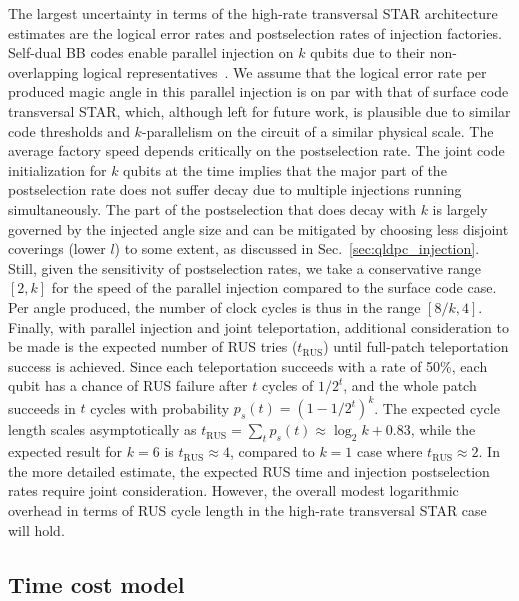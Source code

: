 \documentclass[aps, prx, reprint, superscriptaddress, longbibliography, floatfix]{revtex4-2}
\begin{document}
The largest uncertainty in terms of the high-rate transversal STAR architecture estimates are the logical error rates and postselection rates of injection factories. Self-dual BB codes enable parallel injection on $k$ qubits due to their non-overlapping logical representatives~\cite{Xu2025batched}. We assume that the logical error rate per produced magic angle in this parallel injection is on par with that of surface code transversal STAR, which, although left for future work, is plausible due to similar code thresholds and $k$-parallelism on the circuit of a similar physical scale. The average factory speed depends critically on the postselection rate. The joint code initialization for $k$ qubits at the time implies that the major part of the postselection rate does not suffer decay due to multiple injections running simultaneously. The part of the postselection that does decay with $k$ is largely governed by the injected angle size and can be mitigated by choosing less disjoint coverings (lower $l$) to some extent, as discussed in Sec.~\ref{sec:qldpc_injection}. Still, given the sensitivity of postselection rates, we take a conservative range $[2,k]$ for the speed of the parallel injection compared to the surface code case. Per angle produced, the number of clock cycles is thus in the range $[8/k, 4]$. Finally, with parallel injection and joint teleportation, additional consideration to be made is the expected number of RUS tries ($t_{\mathrm{RUS}}$) until full-patch teleportation success is achieved. Since each teleportation succeeds with a rate of 50\%,  each qubit has a chance of RUS failure after $t$ cycles of $1/2^t$, and the whole patch succeeds in $t$ cycles with probability $p_s(t)=(1-1/2^t)^k$. The expected cycle length scales asymptotically as $t_{\mathrm{RUS}} =\sum_tp_s(t) \approx \log_2k+ 0.83$, while the expected result for $k=6$ is  $t_{\mathrm{RUS}}\approx 4$, compared to $k=1$ case where $t_{\mathrm{RUS}}\approx 2$. In the more detailed estimate, the expected RUS time and injection postselection rates require joint consideration. However, the overall modest logarithmic overhead in terms of RUS cycle length in the high-rate transversal STAR case will hold.




\subsection{Time cost model}
\label{sec:time_cost_model}
\end{document}

